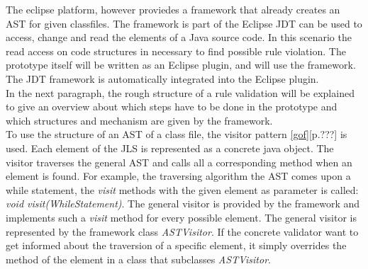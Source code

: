 

The eclipse platform, however proviedes a framework that already creates an \acf{AST} for given classfiles. The framework is part of the Eclipse \acf{JDT} can be used to access, change and read the elements of a Java source code. In this scenario the read access on code structures in necessary to find possible rule violation. The prototype itself will be written as an Eclipse plugin, and will use the framework. The \acf{JDT} framework is automatically integrated into the Eclipse plugin. 
\\

In the next paragraph, the rough structure of a rule validation will be explained to give an overview about which steps have to be done in the prototype and which structures and mechanism are given by the framework.
\\
To use the structure of an \acf{AST} of a class file, the visitor pattern \ref{gof}[p.???] is used. Each element of the \acf{JLS} is represented as a concrete java object. The visitor traverses the general \acf{AST} and calls all a corresponding method when an element is found. For example, the traversing algorithm the \acf{AST} comes upon a while statement, the \textit{visit} methods with the given element as parameter is called: \textit{void visit(WhileStatement)}. The general visitor is provided by the framework and implements such a \textit{visit} method for every possible element. The general visitor is represented by the framework class \textit{ASTVisitor}. If the concrete validator want to get informed about the traversion of a specific element, it simply overrides the method of the element in a class that subclasses \textit{ASTVisitor}. 
\\

